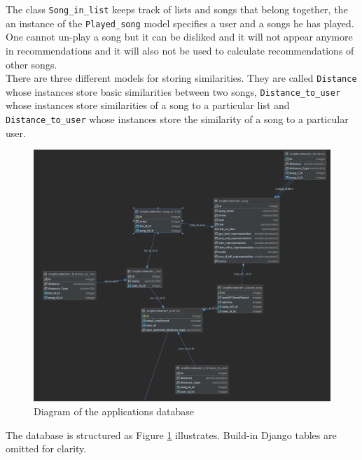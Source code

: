 The class \texttt{Song\_in\_list} keeps track of lists and songs that belong together, the an instance of the \texttt{Played\_song} model specifies a user and a songs he has played. One cannot un-play a song but it can be disliked and it will not appear anymore in recommendations and it will also not be used to calculate recommendations of other songs. \\
There are three different models for storing similarities. They are called \texttt{Distance} whose instances store basic similarities between two songs, \texttt{Distance\_to\_user} whose instances store similarities of a song to a particular list and \texttt{Distance\_to\_user} whose instances store the similarity of a song to a particular user. 
\begin{figure}[ht]
    \centering
	\includegraphics[width=120mm]{./img/postgres_database.png}
	\caption{Diagram of the applications database}
	\label{fig:diagram}
\end{figure}
The database is structured as Figure \ref{fig:diagram} illustrates. Build-in Django tables are omitted for clarity.

